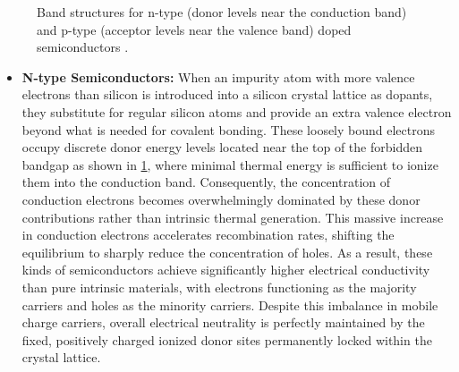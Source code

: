 \begin{figure}[htbp]
    \caption{Band structures for n-type (donor levels near the conduction band) and p-type (acceptor levels near the valence band) doped semiconductors \cite[Chap 11.]{knollRadiationDetectionMeasurement2010}.}
    \label{fig:band_structure_doped}
\end{figure}

\begin{itemize}
  \item \textbf{N-type Semiconductors:} When an impurity atom with more valence electrons than silicon is introduced into a silicon crystal lattice as dopants, they substitute for regular silicon atoms and provide an extra valence electron beyond what is needed for covalent bonding. These loosely bound electrons occupy discrete donor energy levels located near the top of the forbidden bandgap as shown in \cref{fig:band_structure_doped}, where minimal thermal energy is sufficient to ionize them into the conduction band. Consequently, the concentration of conduction electrons becomes overwhelmingly dominated by these donor contributions rather than intrinsic thermal generation. This massive increase in conduction electrons accelerates recombination rates, shifting the equilibrium to sharply reduce the concentration of holes. As a result, these kinds of semiconductors achieve significantly higher electrical conductivity than pure intrinsic materials, with electrons functioning as the majority carriers and holes as the minority carriers. Despite this imbalance in mobile charge carriers, overall electrical neutrality is perfectly maintained by the fixed, positively charged ionized donor sites permanently locked within the crystal lattice.

\end{itemize}
